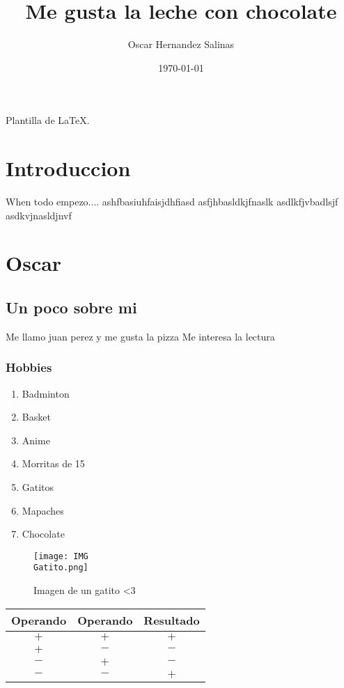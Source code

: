 \documentclass{book}
\author{Oscar Hernandez Salinas}
\title{Me gusta la leche con chocolate}
\date{\today}
\begin{document}
\maketitle


\tableofcontens
{}

\listoffigures
{}

\listoftables
{}

Plantilla de \LaTeX.
\chapter*{Introduccion}
When todo empezo....
ashfbasiuhfaisjdhfiasd
asfjhbasldkjfnaslk
asdlkfjvbadlsjf
asdkvjnasldjnvf

\chapter{Oscar}

\section{Un poco sobre mi}
Me llamo juan perez y me gusta la pizza
Me interesa la lectura ~\cite{}

\subsection{Hobbies}
\begin{enumerate}
\item Badminton
\item Basket
\item Anime
\item Morritas de 15
\item Gatitos
\item Mapaches
\item Chocolate
\end{enumerate}

\begin{figure}
  \texttt{[image: IMG\\Gatito.png]}
  \caption{Imagen de un gatito <3 }
  \label{fig:Gatito}
\end{figure}

\begin{table}[h]
  \centering
  \begin{tabular}{| c | c | c |}
    \hline
    Operando & Operando & Resultado\\\hline
    $+$ & $+$ & $+$\\\hline
    $+$ & $-$ & $-$\\\hline
    $-$ & $+$ & $-$\\\hline
    $-$ & $-$ & $+$\\\hline    
  \end{tabular}
  \label{tab:Signos}
\end{table}
\end{document}
